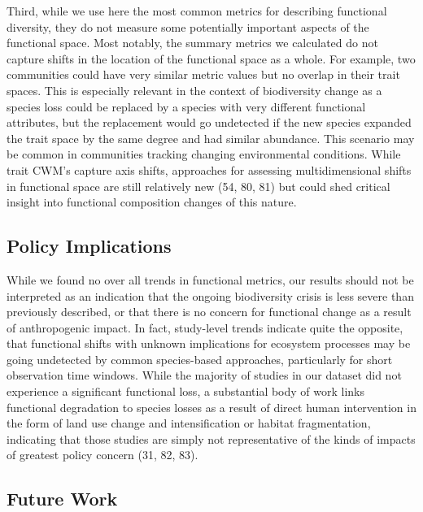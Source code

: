\documentclass{article}
\begin{document}
Third, while we use here the most common metrics for describing
functional diversity, they do not measure some potentially important
aspects of the functional space. Most notably, the summary metrics we
calculated do not capture shifts in the location of the functional space
as a whole. For example, two communities could have very similar metric
values but no overlap in their trait spaces. This is especially relevant
in the context of biodiversity change as a species loss could be
replaced by a species with very different functional attributes, but the
replacement would go undetected if the new species expanded the trait
space by the same degree and had similar abundance. This scenario may be
common in communities tracking changing environmental conditions. While
trait CWM's capture axis shifts, approaches for assessing
multidimensional shifts in functional space are still relatively new
(54, 80, 81) but could shed critical insight into functional composition
changes of this nature.

\hypertarget{policy-implications}{%
\subsection{Policy Implications}\label{policy-implications}}

While we found no over all trends in functional metrics, our results
should not be interpreted as an indication that the ongoing biodiversity
crisis is less severe than previously described, or that there is no
concern for functional change as a result of anthropogenic impact. In
fact, study-level trends indicate quite the opposite, that functional
shifts with unknown implications for ecosystem processes may be going
undetected by common species-based approaches, particularly for short
observation time windows. While the majority of studies in our dataset
did not experience a significant functional loss, a substantial body of
work links functional degradation to species losses as a result of
direct human intervention in the form of land use change and
intensification or habitat fragmentation, indicating that those studies
are simply not representative of the kinds of impacts of greatest policy
concern (31, 82, 83).

\hypertarget{future-work}{%
\subsection{Future Work}\label{future-work}}
\end{document}
